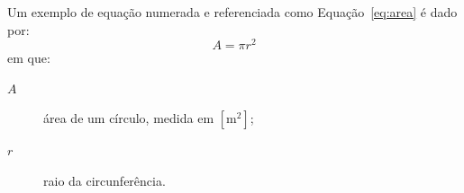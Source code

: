 Um exemplo de equação numerada e referenciada como Equação~\eqref{eq:area} é dado por:
\begin{equation}\label{eq:area}
  A = \pi r^2
\end{equation}
\noindent em que:
\par\nopagebreak\vspace{0.3em}\nopagebreak
\begin{description}
  \item[$A$] área de um círculo, medida em $[\text{m}^2]$;
  \item[$r$] raio da circunferência.
\end{description}
